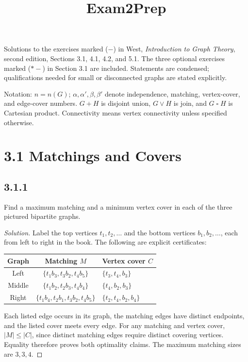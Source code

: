 \documentclass[12pt]{amsart}
\title{Exam2Prep}
\date{}
\newenvironment{solution}{\begin{proof}[Solution]}{\end{proof}}
\newcommand{\cart}{\mathbin{\square}}
\begin{document}
\maketitle

    \noindent Solutions to the exercises marked ($-$) in West, \emph{Introduction to Graph Theory}, second edition, Sections 3.1, 4.1, 4.2, and 5.1. The three optional exercises marked ($*-$) in Section 3.1 are included. Statements are condensed; qualifications needed for small or disconnected graphs are stated explicitly.

    \smallskip\noindent Notation: $n=n(G)$; $\alpha,\alpha',\beta,\beta'$ denote independence, matching, vertex-cover, and edge-cover numbers. $G+H$ is disjoint union, $G\vee H$ is join, and $G\cart H$ is Cartesian product. Connectivity means vertex connectivity unless specified otherwise.

    \section*{3.1 Matchings and Covers}

    \subsection*{3.1.1} Find a maximum matching and a minimum vertex cover in each of the three pictured bipartite graphs.
    \begin{solution}Label the top vertices $t_1,t_2,\ldots$ and the bottom vertices $b_1,b_2,\ldots$, each from left to right in the book. The following are explicit certificates:
        \begin{center}\begin{tabular}{ccl}\toprule
            Graph & Matching $M$ & Vertex cover $C$\\\midrule
            Left & $\{t_1b_3,t_3b_2,t_4b_5\}$ & $\{t_3,t_4,b_3\}$\\
            Middle & $\{t_1b_2,t_2b_3,t_4b_4\}$ & $\{t_4,b_2,b_3\}$\\
            Right & $\{t_1b_4,t_2b_1,t_3b_2,t_4b_5\}$ & $\{t_2,t_4,b_2,b_4\}$\\\bottomrule
            \end{tabular}\end{center}
        Each listed edge occurs in its graph, the matching edges have distinct endpoints, and the listed cover meets every edge. For any matching and vertex cover, $|M|\le |C|$, since distinct matching edges require distinct covering vertices. Equality therefore proves both optimality claims. The maximum matching sizes are $3,3,4$.\end{solution}
\end{document}
